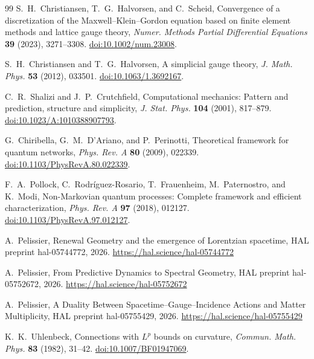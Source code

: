 \documentclass[11pt]{article}
\numberwithin{equation}{section}
\theoremstyle{definition}
\theoremstyle{remark}
\begin{document}
\begin{thebibliography}{99}
S.~H.~Christiansen, T.~G.~Halvorsen, and C.~Scheid,
Convergence of a discretization of the Maxwell--Klein--Gordon equation based on finite element methods and lattice gauge theory,
\emph{Numer. Methods Partial Differential Equations} \textbf{39} (2023), 3271--3308.
\href{https://doi.org/10.1002/num.23008}{doi:10.1002/num.23008}.

S.~H.~Christiansen and T.~G.~Halvorsen,
A simplicial gauge theory,
\emph{J. Math. Phys.} \textbf{53} (2012), 033501.
\href{https://doi.org/10.1063/1.3692167}{doi:10.1063/1.3692167}.

C.~R.~Shalizi and J.~P.~Crutchfield,
Computational mechanics: Pattern and prediction, structure and simplicity,
\emph{J. Stat. Phys.} \textbf{104} (2001), 817--879.
\href{https://doi.org/10.1023/A:1010388907793}{doi:10.1023/A:1010388907793}.

G.~Chiribella, G.~M.~D'Ariano, and P.~Perinotti,
Theoretical framework for quantum networks,
\emph{Phys. Rev. A} \textbf{80} (2009), 022339.
\href{https://doi.org/10.1103/PhysRevA.80.022339}{doi:10.1103/PhysRevA.80.022339}.

F.~A.~Pollock, C.~Rodr\'iguez-Rosario, T.~Frauenheim,
M.~Paternostro, and K.~Modi,
Non-Markovian quantum processes: Complete framework and efficient characterization,
\emph{Phys. Rev. A} \textbf{97} (2018), 012127.
\href{https://doi.org/10.1103/PhysRevA.97.012127}{doi:10.1103/PhysRevA.97.012127}.

A.~Pelissier,
\newblock Renewal Geometry and the emergence of Lorentzian spacetime,
\newblock HAL preprint hal-05744772, 2026.
\newblock \url{https://hal.science/hal-05744772}

A.~Pelissier,
\newblock From Predictive Dynamics to Spectral Geometry,
\newblock HAL preprint hal-05752672, 2026.
\newblock \url{https://hal.science/hal-05752672}

A.~Pelissier,
\newblock A Duality Between Spacetime--Gauge--Incidence Actions and Matter Multiplicity,
\newblock HAL preprint hal-05755429, 2026.
\newblock \url{https://hal.science/hal-05755429}

K.~K.~Uhlenbeck,
Connections with $L^p$ bounds on curvature,
\emph{Commun. Math. Phys.} \textbf{83} (1982), 31--42.
\href{https://doi.org/10.1007/BF01947069}{doi:10.1007/BF01947069}.


\end{thebibliography}
\end{document}
